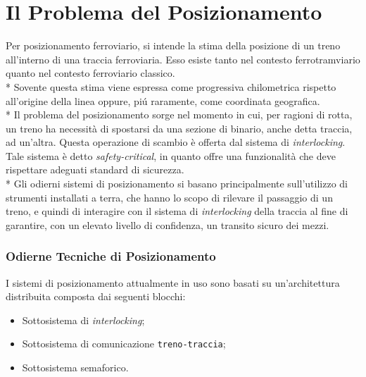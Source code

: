 \section{Il Problema del Posizionamento}
Per posizionamento ferroviario, si intende la stima della posizione di un treno all'interno di una traccia ferroviaria. Esso esiste tanto nel contesto ferrotramviario quanto nel contesto ferroviario classico.\\*
Sovente questa stima viene espressa come progressiva chilometrica rispetto all'origine della linea oppure, pi\'u raramente, come coordinata geografica.\\*
Il problema del posizionamento sorge nel momento in cui, per ragioni di rotta, un treno ha necessit\`a di spostarsi da una sezione di binario, anche detta traccia, ad un'altra. Questa operazione di scambio \`e offerta dal sistema di \emph{interlocking}. Tale sistema \`e detto \emph{safety-critical}, in quanto offre una funzionalit\`a che deve rispettare adeguati standard di sicurezza.\\*
Gli odierni sistemi di posizionamento si basano principalmente sull'utilizzo di strumenti installati a terra, che hanno lo scopo di rilevare il passaggio di un treno, e quindi di interagire con il sistema di \emph{interlocking} della traccia al fine di garantire, con un elevato livello di confidenza, un transito sicuro dei mezzi.
\subsubsection{Odierne Tecniche di Posizionamento}
I sistemi di posizionamento attualmente in uso sono basati su un'architettura distribuita composta dai seguenti blocchi:
\begin{itemize}
	\item Sottosistema di \emph{interlocking};
	\item Sottosistema di comunicazione \texttt{treno-traccia};
	\item Sottosistema semaforico.
\end{itemize}
